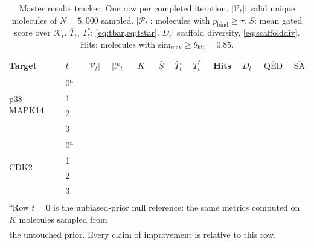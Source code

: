\documentclass[11pt]{article}
\newcommand{\FILL}[1]{\textcolor{blue!65!black}{\underline{\textsf{#1}}}}
\newcommand{\pbind}{p_{\mathrm{bind}}}          %
\newcommand{\Valid}{\mathcal{V}}                %
\newcommand{\Passed}{\mathcal{P}}               %
\newcommand{\TopK}{\mathcal{K}}                 %
\newcommand{\simmax}{\mathrm{sim}_{\max}}
\newcommand{\thetahit}{\theta_{\mathrm{hit}}}
\newcommand{\Tbar}{\bar{T}}
\newcommand{\Tstar}{T^{*}}
\newcommand{\SAscore}{\mathrm{SA}}
\newcommand{\QEDs}{\mathrm{QED}}
\newcommand{\Ngen}{N}
\newcommand{\Kk}{K}
\begin{document}
\begin{table}[t]
\centering
\caption{Master results tracker. One row per completed iteration.
$|\Valid_t|$: valid unique molecules of $\Ngen = 5{,}000$ sampled.
$|\Passed_t|$: molecules with $\pbind \ge \tau$.
$\bar{S}$: mean gated score over $\TopK_t$.
$\Tbar_t$, $\Tstar_t$: \cref{eq:tbar,eq:tstar}.
$D_t$: scaffold diversity, \cref{eq:scaffolddiv}.
Hits: molecules with $\simmax \ge \thetahit = 0.85$.}
\label{tab:master}
\small
\setlength{\tabcolsep}{4pt}
\begin{tabular}{llrrrrrrrrrr}
\toprule
Target & $t$ & $|\Valid_t|$ & $|\Passed_t|$ & $\Kk$ & $\bar{S}$ &
$\Tbar_t$ & $\Tstar_t$ & Hits & $D_t$ & $\overline{\QEDs}$ & $\overline{\SAscore}$ \\
\midrule
\multirow{4}{*}{p38 MAPK14}
 & 0\textsuperscript{a} & --- & --- & --- & --- & \FILL{} & \FILL{} & \FILL{} & \FILL{} & \FILL{} & \FILL{} \\
 & 1 & \FILL{} & \FILL{} & \FILL{} & \FILL{} & \FILL{} & \FILL{} & \FILL{} & \FILL{} & \FILL{} & \FILL{} \\
 & 2 & \FILL{} & \FILL{} & \FILL{} & \FILL{} & \FILL{} & \FILL{} & \FILL{} & \FILL{} & \FILL{} & \FILL{} \\
 & 3 & \FILL{} & \FILL{} & \FILL{} & \FILL{} & \FILL{} & \FILL{} & \FILL{} & \FILL{} & \FILL{} & \FILL{} \\
\midrule
\multirow{4}{*}{CDK2}
 & 0\textsuperscript{a} & --- & --- & --- & --- & \FILL{} & \FILL{} & \FILL{} & \FILL{} & \FILL{} & \FILL{} \\
 & 1 & \FILL{} & \FILL{} & \FILL{} & \FILL{} & \FILL{} & \FILL{} & \FILL{} & \FILL{} & \FILL{} & \FILL{} \\
 & 2 & \FILL{} & \FILL{} & \FILL{} & \FILL{} & \FILL{} & \FILL{} & \FILL{} & \FILL{} & \FILL{} & \FILL{} \\
 & 3 & \FILL{} & \FILL{} & \FILL{} & \FILL{} & \FILL{} & \FILL{} & \FILL{} & \FILL{} & \FILL{} & \FILL{} \\
\midrule
\multicolumn{12}{l}{\footnotesize
  \textsuperscript{a}Row $t=0$ is the unbiased-prior null reference: the same
  metrics computed on $\Kk$ molecules sampled from} \\
\multicolumn{12}{l}{\footnotesize
  \phantom{a}the untouched prior. Every claim of improvement is relative to this row.} \\
\bottomrule
\end{tabular}
\end{table}

\end{document}
